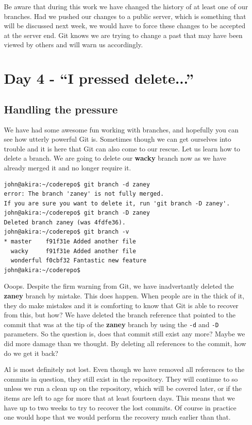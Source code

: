 Be aware that during this work we have changed the history of at least one of our branches.  Had we pushed our changes to a public server, which is something that will be discussed next week, we would have to force these changes to be accepted at the server end.  Git knows we are trying to change a past that may have been viewed by others and will warn us accordingly.

\section{Day 4 - ``I pressed delete...''}
\subsection{Handling the pressure}

We have had some awesome fun working with branches, and hopefully you can see how utterly powerful Git is.  Sometimes though we can get ourselves into trouble and it is here that Git can also come to our rescue.  Let us learn how to delete a branch.  We are going to delete our \textbf{wacky} branch now as we have already merged it and no longer require it.

\begin{Verbatim}[frame=leftline,framerule=1mm,fontsize=\relsize{-3}] 
john@akira:~/coderepo$ git branch -d zaney
error: The branch 'zaney' is not fully merged.
If you are sure you want to delete it, run 'git branch -D zaney'.
john@akira:~/coderepo$ git branch -D zaney
Deleted branch zaney (was 4fdfe36).
john@akira:~/coderepo$ git branch -v
* master    f91f31e Added another file
  wacky     f91f31e Added another file
  wonderful f0cbf32 Fantastic new feature
john@akira:~/coderepo$ 
\end{Verbatim}

Ooops.  Despite the firm warning from Git, we have inadvertantly deleted the \textbf{zaney} branch by mistake.  This does happen.  When people are in the thick of it, they do make mistakes and it is comforting to know that Git is able to recover from this, but how?  We have deleted the branch reference that pointed to the commit that was at the tip of the \textbf{zaney} branch by using the \texttt{-d} and \texttt{-D} parameters.  So the question is, does that commit still exist any more?  Maybe we did more damage than we thought.  By deleting all references to the commit, how do we get it back?

Al is most definitely not lost.  Even though we have removed all references to the commits in question, they still exist in the repository.  They will continue to so unless we run a clean up on the repository, which will be covered later, or if the items are left to age for more that at least fourteen days.  This means that we have up to two weeks to try to recover the lost commits.  Of course in practice one would hope that we would perform the recovery much earlier than that.

